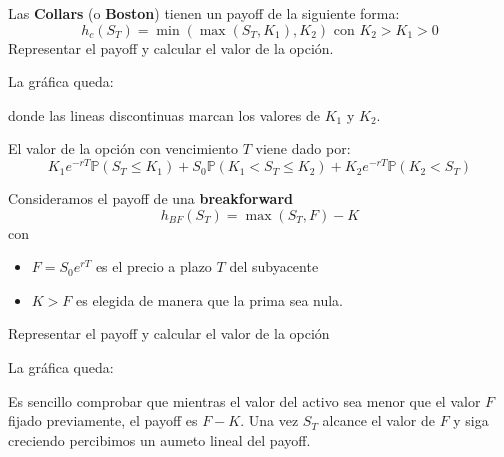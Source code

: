 \begin{problem}[3]
Las \textbf{Collars} (o \textbf{Boston}) tienen un payoff de la siguiente forma:
\[h_c(S_T) = \min\left(\max(S_T,K_1),K_2 \right)\text{ con } K_2 > K_1 > 0\]
Representar el payoff y calcular el valor de la opción.
\solution
{}

La gráfica queda:
\begin{center}
\end{center}

donde las lineas discontinuas marcan los valores de $K_1$ y $K_2$.

El valor de la opción con vencimiento $T$ viene dado por:
\[K_1e^{-rT}\mathbb{P}(S_T\leq K_1) + S_0 \mathbb{P}(K_1 < S_T \leq K_2) + K_2e^{-rT}\mathbb{P}(K_2 < S_T)\]

\end{problem}

\begin{problem}[4]
Consideramos el payoff de una \textbf{breakforward}
\[h_{BF}(S_T) = \max(S_T,F)-K\]
con
\begin{itemize}
\item $F=S_0e^{rT}$ es el precio a plazo $T$ del subyacente
\item $K>F$ es elegida de manera que la prima sea nula.
\end{itemize}

Representar el payoff y calcular el valor de la opción

\solution
{}

La gráfica queda:
\begin{center}
\end{center}

Es sencillo comprobar que mientras el valor del activo sea menor que el valor $F$ fijado previamente, el payoff es $F-K$. Una vez $S_T$ alcance el valor de $F$ y siga creciendo percibimos un aumeto lineal del payoff.

\end{problem}

